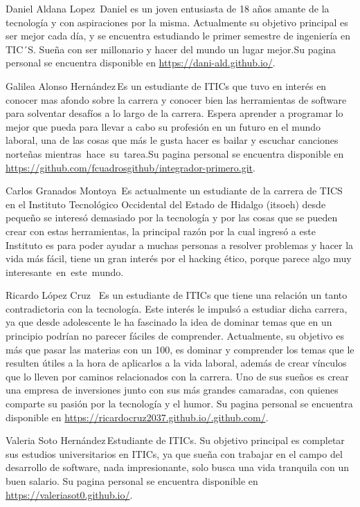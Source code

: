 \documentclass{IEEEcsmag}
\begin{document}
\begin{IEEEbiography}{Daniel Aldana Lopez}{\,}
Daniel es un joven entusiasta de 18 años amante de la tecnología y con aspiraciones por la misma. Actualmente su objetivo principal es ser mejor cada día, y se encuentra estudiando le primer semestre de ingeniería en TIC´S. Sueña con ser millonario y hacer del mundo un lugar mejor.Su pagina personal se encuentra disponible en \href{https://dani-ald.github.io/}{https://dani-ald.github.io/}.
\end{IEEEbiography}
\begin{IEEEbiography}{Galilea Alonso Hernández}{\,}Es un estudiante de ITICs que tuvo en interés en conocer mas afondo sobre la carrera y conocer bien las herramientas de software para solventar desafíos a lo largo de la carrera. Espera aprender a programar lo mejor que pueda para llevar a cabo su profesión en un futuro en el mundo laboral, una de las cosas que más le gusta hacer es bailar y escuchar canciones norteñas mientras hace su tarea.Su pagina personal se encuentra disponible en \href{https://github.com/fcuadrosgithub/integrador-primero.git}{https://github.com/fcuadrosgithub/integrador-primero.git}.
\end{IEEEbiography}
\begin{IEEEbiography}{Carlos Granados Montoya }{\,}Es actualmente un estudiante de la carrera de TICS en el Instituto Tecnológico Occidental del Estado de Hidalgo (itsoeh) desde pequeño se interesó demasiado por la tecnología y por las cosas que se pueden crear con estas herramientas, la principal razón por la cual ingresó a este Instituto es para poder ayudar a muchas personas a resolver problemas y hacer la vida más fácil, tiene un gran interés por el hacking ético, porque parece algo muy interesante en este mundo.
\end{IEEEbiography}
\begin{IEEEbiography}{Ricardo López Cruz }{\,} Es un estudiante de ITICs que tiene una relación un tanto contradictoria con la tecnología. Este interés le impulsó a estudiar dicha carrera, ya que desde adolescente le ha fascinado la idea de dominar temas que en un principio podrían no parecer fáciles de comprender. Actualmente, su objetivo es más que pasar las materias con un 100, es dominar y comprender los temas que le resulten útiles a la hora de aplicarlos a la vida laboral, además de crear vínculos que lo lleven por caminos relacionados con la carrera. Uno de sus sueños es crear una empresa de inversiones junto con sus más grandes camaradas, con quienes comparte su pasión por la tecnología y el humor. Su pagina  personal se encuentra disponible en \href{https://ricardocruz2037.github.io/.github.com/}{https://ricardocruz2037.github.io/.github.com/}.\end{IEEEbiography}
\begin{IEEEbiography}{Valeria Soto Hernández}{\,}Estudiante de ITICs. Su objetivo principal  es completar sus estudios universitarios en ITICs, ya que sueña con trabajar en el campo del desarrollo de software, nada impresionante, solo busca una vida tranquila con un buen salario. Su pagina  personal se encuentra disponible en \href{https://valeriasot0.github.io/}{https://valeriasot0.github.io/}.
\end{IEEEbiography}
\end{document}
